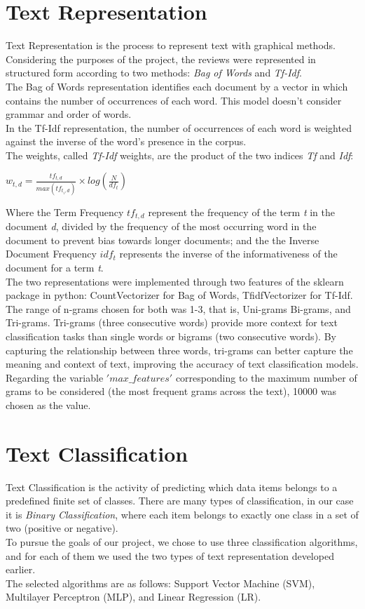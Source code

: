 \documentclass[fleqn,10pt]{SelfArx} %
\begin{document}
\section{Text Representation}
Text Representation is the process to represent text with graphical methods. Considering the purposes of the project, the reviews were represented in structured form according to two methods: \textit{Bag of Words} and \textit{Tf-Idf}.\\
The Bag of Words representation identifies each document by a vector in which contains the number of occurrences of each word. This model doesn't consider grammar and order of words.\\
In the Tf-Idf representation, the number of occurrences of each word is weighted against the inverse of the word's presence in the corpus.\\
The weights, called \textit{Tf-Idf} weights, are the product of the two indices \textit{Tf} and \textit{Idf}:
\begin{center}
$w_{t,d} = \frac{tf_{t,d}}{max (tf_{t_i,d})} \times log(\frac{N}{df_t})$
\end{center}
Where the Term Frequency \textit{$tf_{t,d}$} represent the frequency of the term \textit{t} in the document \textit{d}, divided by the frequency of the most occurring word in the document to prevent bias towards longer documents; and the the Inverse Document Frequency \textit{$idf_t$} represents the inverse of the informativeness of the document for a term \textit{t}.\\
The two representations were implemented through two features of the sklearn package in python: CountVectorizer for Bag of Words, TfidfVectorizer for Tf-Idf. The range of n-grams chosen for both was 1-3, that is, Uni-grams Bi-grams, and Tri-grams. Tri-grams (three consecutive words) provide more context for text classification tasks than single words or bigrams (two consecutive words). By capturing the relationship between three words, tri-grams can better capture the meaning and context of text, improving the accuracy of text classification models.\\
Regarding the variable $'max\_features'$ corresponding to the maximum number of grams to be considered (the most frequent grams across the text), 10000 was chosen as the value.

\section{Text Classification}
Text Classification is the activity of predicting which data items belongs to a predefined finite set of classes. There are many types of classification, in our case it is \textit{Binary Classification}, where each item belongs to exactly one class in a set of two (positive or negative).\\
To pursue the goals of our project, we chose to use three classification algorithms, and for each of them we used the two types of text representation developed earlier.\\
The selected algorithms are as follows: Support Vector Machine (SVM), Multilayer Perceptron (MLP), and Linear Regression (LR).
\end{document}
